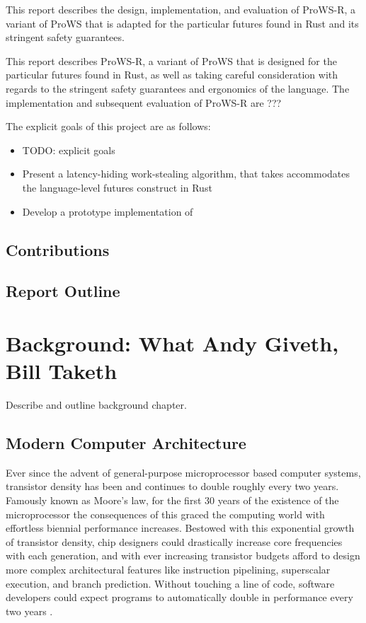 \documentclass[bsc,frontabs,singlespacing,parskip,deptreport,normalheadings]{infthesis}
\begin{document}
This report describes the
design, implementation, and evaluation of ProWS-R, a variant of ProWS that is
adapted for the particular futures found in Rust and its stringent safety
guarantees.

This report describes ProWS-R, a variant of ProWS that is designed for the
particular futures found in Rust, as well as taking careful consideration with
regards to the stringent safety guarantees and ergonomics of the language. The
implementation and subsequent evaluation of ProWS-R are ???

The explicit goals of this project are as follows:

\begin{itemize}
    \item TODO: explicit goals
    \item Present a latency-hiding work-stealing algorithm, that takes
        accommodates the language-level futures construct in Rust
    \item Develop a prototype implementation of 
\end{itemize}

\section{Contributions}

\section{Report Outline}


\chapter{Background: What Andy Giveth, Bill Taketh}

Describe and outline background chapter.

\section{Modern Computer Architecture}

Ever since the advent of general-purpose microprocessor based computer systems,
transistor density has been and continues to double roughly every two years.
Famously known as Moore's law, for the first 30 years of the existence of the
microprocessor the consequences of this graced the computing world with
effortless biennial performance increases. Bestowed with this exponential growth
of transistor density, chip designers could drastically increase core
frequencies with each generation, and with ever increasing transistor budgets
afford to design more complex architectural features like instruction
pipelining, superscalar execution, and branch prediction. Without touching a
line of code, software developers could expect programs to automatically double
in performance every two years \cite{hennessy_new_2019}.
\end{document}
